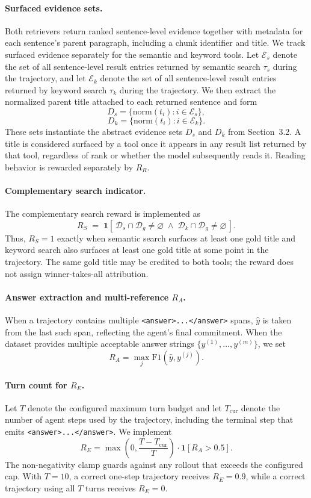 \documentclass[11pt]{article}
\begin{document}
\paragraph{Surfaced evidence sets.}
Both retrievers return ranked sentence-level evidence together with metadata for each sentence's parent paragraph, including a chunk identifier and title. We track surfaced evidence separately for the semantic and keyword tools. Let \(\mathcal{E}_s\) denote the set of all sentence-level result entries returned by semantic search \(\tau_s\) during the trajectory, and let \(\mathcal{E}_k\) denote the set of all sentence-level result entries returned by keyword search \(\tau_k\) during the trajectory. We then extract the normalized parent title attached to each returned sentence and form
\[
D_s = \{\mathrm{norm}(t_i) : i \in \mathcal{E}_s\},
\]
\[
D_k = \{\mathrm{norm}(t_i) : i \in \mathcal{E}_k\}.
\]
These sets instantiate the abstract evidence sets \(D_s\) and \(D_k\) from Section~3.2. A title is considered surfaced by a tool once it appears in any result list returned by that tool, regardless of rank or whether the model subsequently reads it. Reading behavior is rewarded separately by \(R_R\).

\paragraph{Complementary search indicator.}
The complementary search reward is implemented as
\[
R_S\;=\;\mathbf{1}\!\left[\,\mathcal{D}_s\cap\mathcal{D}_g\neq\varnothing \;\wedge\; \mathcal{D}_k\cap\mathcal{D}_g\neq\varnothing\,\right].
\]
Thus, $R_S=1$ exactly when semantic search surfaces at least one gold title and keyword search also surfaces at least one gold title at some point in the trajectory. The same gold title may be credited to both tools; the reward does not assign winner-takes-all attribution. 

\paragraph{Answer extraction and multi-reference $R_A$.}
When a trajectory contains multiple \texttt{<answer>...</answer>} spans, $\hat{y}$ is taken from the last such span, reflecting the agent's final commitment. When the dataset provides multiple acceptable answer strings $\{y^{(1)},\dots,y^{(m)}\}$, we set
\[
R_A
=
\max_j \mathrm{F1}(\hat{y},y^{(j)}).
\]

\paragraph{Turn count for $R_E$.}
Let $T$ denote the configured maximum turn budget and let $T_{\mathrm{cur}}$ denote the number of agent steps used by the trajectory, including the terminal step that emits \texttt{<answer>...</answer>}. We implement
\[
R_E
=
\max\!\left(0,\frac{T-T_{\mathrm{cur}}}{T}\right)
\cdot
\mathbf{1}[R_A>0.5].
\]
The non-negativity clamp guards against any rollout that exceeds the configured cap. With $T=10$, a correct one-step trajectory receives $R_E=0.9$, while a correct trajectory using all $T$ turns receives $R_E=0$.
\end{document}
